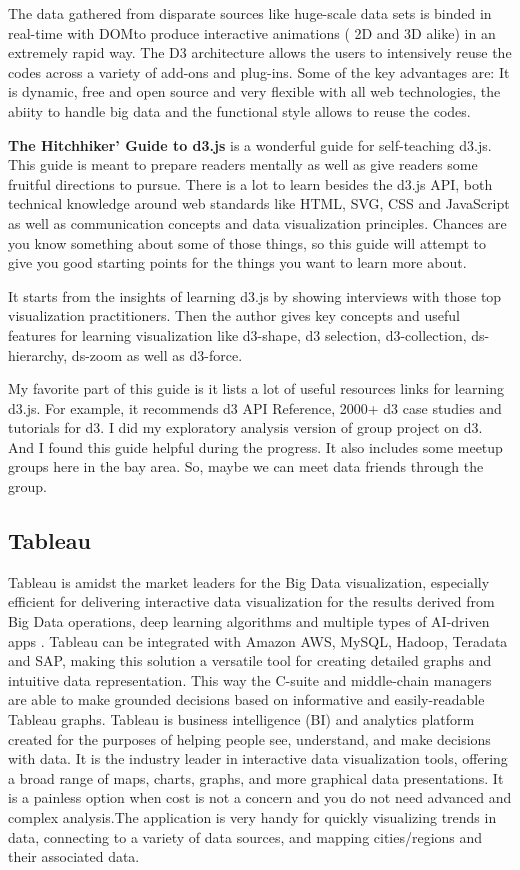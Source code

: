 \documentclass[]{book}
\theoremstyle{definition}
\theoremstyle{definition}
\theoremstyle{definition}
\theoremstyle{remark}
\begin{document}
The data gathered from disparate sources like huge-scale data sets is
binded in real-time with DOMto produce interactive animations ( 2D and
3D alike) in an extremely rapid way. The D3 architecture allows the
users to intensively reuse the codes across a variety of add-ons and
plug-ins. Some of the key advantages are: It is dynamic, free and open
source and very flexible with all web technologies, the abiity to handle
big data and the functional style allows to reuse the codes.

\textbf{The Hitchhiker' Guide to d3.js} is a wonderful guide for
self-teaching d3.js. This guide is meant to prepare readers mentally as
well as give readers some fruitful directions to pursue. There is a lot
to learn besides the d3.js API, both technical knowledge around web
standards like HTML, SVG, CSS and JavaScript as well as communication
concepts and data visualization principles. Chances are you know
something about some of those things, so this guide will attempt to give
you good starting points for the things you want to learn more about.

It starts from the insights of learning d3.js by showing interviews with
those top visualization practitioners. Then the author gives key
concepts and useful features for learning visualization like d3-shape,
d3 selection, d3-collection, ds-hierarchy, ds-zoom as well as d3-force.

My favorite part of this guide is it lists a lot of useful resources
links for learning d3.js. For example, it recommends d3 API Reference,
2000+ d3 case studies and tutorials for d3. I did my exploratory
analysis version of group project on d3. And I found this guide helpful
during the progress. It also includes some meetup groups here in the bay
area. So, maybe we can meet data friends through the group.

\subsection{Tableau}\label{tableau}

Tableau is amidst the market leaders for the Big Data visualization,
especially efficient for delivering interactive data visualization for
the results derived from Big Data operations, deep learning algorithms
and multiple types of AI-driven apps \citep{tableau_interactive_viz}.
Tableau can be integrated with Amazon AWS, MySQL, Hadoop, Teradata and
SAP, making this solution a versatile tool for creating detailed graphs
and intuitive data representation. This way the C-suite and middle-chain
managers are able to make grounded decisions based on informative and
easily-readable Tableau graphs. Tableau is business intelligence (BI)
and analytics platform created for the purposes of helping people see,
understand, and make decisions with data. It is the industry leader in
interactive data visualization tools, offering a broad range of maps,
charts, graphs, and more graphical data presentations. It is a painless
option when cost is not a concern and you do not need advanced and
complex analysis.The application is very handy for quickly visualizing
trends in data, connecting to a variety of data sources, and mapping
cities/regions and their associated data.
\end{document}
